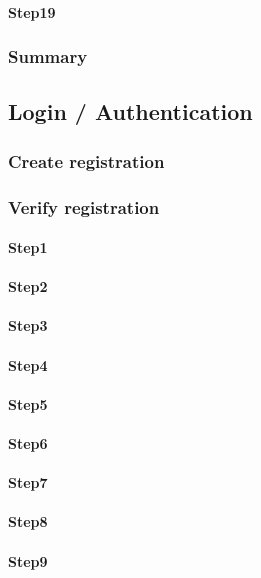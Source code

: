 \documentclass[a4paper, 11pt]{scrartcl}
\begin{document}
\paragraph{Step19}

\subsubsection{Summary}

\subsection{Login / Authentication}

\subsubsection{Create registration}

\subsubsection{Verify registration}

\paragraph{Step1}
\paragraph{Step2}
\paragraph{Step3}
\paragraph{Step4}
\paragraph{Step5}
\paragraph{Step6}
\paragraph{Step7}
\paragraph{Step8}
\paragraph{Step9}
\end{document}
